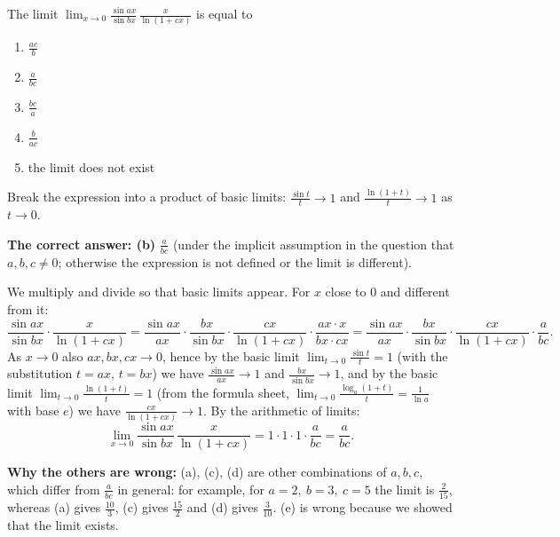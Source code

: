 
\begin{question}
The limit $\displaystyle\lim_{x\to 0}\frac{\sin ax}{\sin bx}\,\frac{x}{\ln(1+cx)}$ is equal to
\begin{enumerate}
  \item $\frac{ac}{b}$
  \item $\frac{a}{bc}$
  \item $\frac{bc}{a}$
  \item $\frac{b}{ac}$
  \item the limit does not exist
\end{enumerate}
\end{question}

\begin{hint}
Break the expression into a product of basic limits: $\frac{\sin t}{t}\to 1$ and $\frac{\ln(1+t)}{t}\to 1$ as $t\to 0$.
\end{hint}

\begin{solution}
\textbf{The correct answer: (b)} $\frac{a}{bc}$ (under the implicit assumption in the question that $a,b,c\neq 0$; otherwise the expression is not defined or the limit is different).

We multiply and divide so that basic limits appear. For $x$ close to 0 and different from it:
\[
\frac{\sin ax}{\sin bx}\cdot\frac{x}{\ln(1+cx)}
=\frac{\sin ax}{ax}\cdot\frac{bx}{\sin bx}\cdot\frac{cx}{\ln(1+cx)}\cdot\frac{ax\cdot x}{bx\cdot cx}
=\frac{\sin ax}{ax}\cdot\frac{bx}{\sin bx}\cdot\frac{cx}{\ln(1+cx)}\cdot\frac{a}{bc}.
\]
As $x\to 0$ also $ax,bx,cx\to 0$, hence by the basic limit $\lim_{t\to 0}\frac{\sin t}{t}=1$ (with the substitution $t=ax$, $t=bx$) we have
$\frac{\sin ax}{ax}\to 1$ and $\frac{bx}{\sin bx}\to 1$, and by the basic limit $\lim_{t\to 0}\frac{\ln(1+t)}{t}=1$ (from the formula sheet, $\lim_{t\to0}\frac{\log_a(1+t)}{t}=\frac{1}{\ln a}$ with base $e$) we have $\frac{cx}{\ln(1+cx)}\to 1$.
By the arithmetic of limits:
\[
\lim_{x\to 0}\frac{\sin ax}{\sin bx}\,\frac{x}{\ln(1+cx)}=1\cdot 1\cdot 1\cdot\frac{a}{bc}=\boxed{\frac{a}{bc}}.
\]

\textbf{Why the others are wrong:} (a), (c), (d) are other combinations of $a,b,c$, which differ from $\frac{a}{bc}$ in general: for example, for $a=2,\ b=3,\ c=5$ the limit is $\frac{2}{15}$, whereas (a) gives $\frac{10}{3}$, (c) gives $\frac{15}{2}$ and (d) gives $\frac{3}{10}$. (e) is wrong because we showed that the limit exists.
\end{solution}
